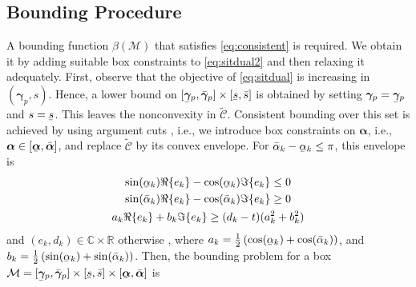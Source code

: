 \documentclass[a4paper,10pt,journal]{IEEEtran}
\let\vec\bm
\newcommand{\ubar}[1]{\underaccent{\bar}{#1}}
\begin{document}
\subsection{Bounding Procedure} \label{sec:sit:bounding}
A bounding function $\beta(\mathcal M)$ that satisfies \cref{eq:consistent} is required. We obtain it by adding suitable box constraints to \cref{eq:sitdual2} and then relaxing it adequately.
First, observe that the objective of \cref{eq:sitdual} is increasing in $(\vec\gamma_p, s)$. Hence, a lower bound on $[\ubar{\vec\gamma}_p, \bar{\vec\gamma}_p] \times [\ubar s, \bar s]$ is obtained by setting $\vec\gamma_p = \ubar{\vec\gamma}_p$ and $s = \ubar s$.
This leaves the nonconvexity in $\tilde{\mathcal C}$. Consistent bounding over this set is achieved by using argument cuts \cite{Lu2017}, i.e., we introduce box constraints on $\vec\alpha$, i.e., $\vec\alpha\in[\ubar{\vec\alpha}, \bar{\vec\alpha}]$, and replace $\tilde{\mathcal C}$ by its convex envelope.
For $\bar\alpha_k - \ubar{\alpha}_k \le \pi$, this envelope is
\begin{subequations}
	\label{eq:crelax}
\begin{gather}
	\sin(\ubar\alpha_k) \Re\{e_k\} - \cos(\ubar\alpha_k) \Im\{e_k\} \le 0 \label{eq:crelax:1} \\
	\sin(\bar\alpha_k) \Re\{e_k\} - \cos(\bar\alpha_k) \Im\{e_k\} \ge 0 \label{eq:crelax:2} \\
	a_k \Re\{e_k\} + b_k \Im\{e_k\} \ge (d_k - t) (a_k^2 + b_k^2) \label{eq:crelax:3}
\end{gather}
\end{subequations}
and $(e_k, d_k) \in \mathds C \times \mathds R$ otherwise \cite[Prop.~1]{Lu2017},
where
$a_k = \tfrac{1}{2} \left( \cos(\ubar\alpha_k) + \cos(\bar\alpha_k) \right)$, and
$b_k = \tfrac{1}{2} \left( \sin(\ubar\alpha_k) + \sin(\bar\alpha_k) \right)$.
Then, the bounding problem for a box $\mathcal M = [\ubar{\vec\gamma}_p, \bar{\vec\gamma}_p] \times [\ubar s, \bar s] \times [\ubar{\vec\alpha}, \bar{\vec\alpha}]$ is
\end{document}
